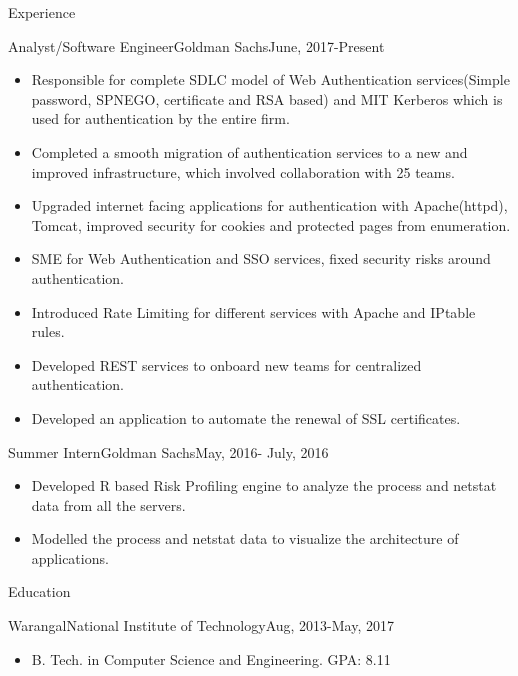 \documentclass[]{mcdowellcv}
\begin{document}
\makeheader
\begin{cvsection}{Experience}
	\begin{cvsubsection}{Analyst/Software Engineer}{Goldman Sachs}{June, 2017-Present}
		            
		\begin{itemize}%
		    \item Responsible for complete SDLC model of Web Authentication services(Simple password, SPNEGO,  certificate and RSA based)  and MIT Kerberos which is used for authentication by the entire firm.
		    \item Completed a smooth migration of authentication services to a new and improved infrastructure, which involved collaboration with 25 teams.
		    \item Upgraded internet facing applications for authentication with Apache(httpd), Tomcat, improved security for cookies and protected pages from enumeration.
        	\item SME for Web Authentication and SSO services, fixed security risks around authentication.
		    \item Introduced Rate Limiting for different services with Apache and IPtable rules.
        	\item Developed REST services to onboard new teams for centralized authentication.
            \item Developed an application to automate the renewal of SSL certificates.
		\end{itemize}
	\end{cvsubsection}
	\begin{cvsubsection}{Summer Intern}{Goldman Sachs}{May, 2016- July, 2016}
		            
		\begin{itemize}%
			\item Developed R based Risk Profiling engine to analyze the process and netstat data from all the servers.
			\item Modelled the process and netstat data to visualize the architecture of applications.
		\end{itemize}
	\end{cvsubsection}
\end{cvsection}
\begin{cvsection}{Education}
	\begin{cvsubsection}{Warangal}{National Institute of Technology}{Aug, 2013-May, 2017}
		\begin{itemize}
			\item B. Tech. in Computer Science and Engineering. GPA: 8.11
		\end{itemize}
	\end{cvsubsection}
\end{cvsection}
\end{document}
